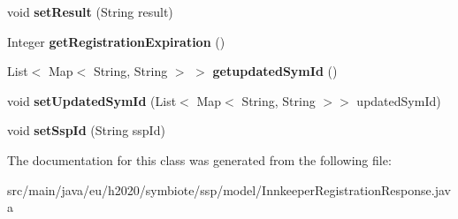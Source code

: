 \begin{DoxyCompactItemize}
void {\bfseries set\+Result} (String result)
\item 
\mbox{\label{classeu_1_1h2020_1_1symbiote_1_1ssp_1_1model_1_1InnkeeperRegistrationResponse_aedce74df15b381f95d94977c04964fd6}} 
Integer {\bfseries get\+Registration\+Expiration} ()
\item 
\mbox{\label{classeu_1_1h2020_1_1symbiote_1_1ssp_1_1model_1_1InnkeeperRegistrationResponse_a85e75ed87ddbd7cd56afe4d489a2d3fd}} 
List$<$ Map$<$ String, String $>$ $>$ {\bfseries getupdated\+Sym\+Id} ()
\item 
\mbox{\label{classeu_1_1h2020_1_1symbiote_1_1ssp_1_1model_1_1InnkeeperRegistrationResponse_aa13f2915b2abc137054ab45e33492079}} 
void {\bfseries set\+Updated\+Sym\+Id} (List$<$ Map$<$ String, String $>$$>$ updated\+Sym\+Id)
\item 
\mbox{\label{classeu_1_1h2020_1_1symbiote_1_1ssp_1_1model_1_1InnkeeperRegistrationResponse_ac5c068c77ca9e666436a620fd3d6a650}} 
void {\bfseries set\+Ssp\+Id} (String ssp\+Id)
\end{DoxyCompactItemize}


The documentation for this class was generated from the following file\+:\begin{DoxyCompactItemize}
\item 
src/main/java/eu/h2020/symbiote/ssp/model/Innkeeper\+Registration\+Response.\+java\end{DoxyCompactItemize}
